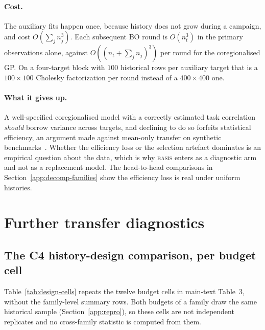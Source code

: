 \documentclass[10pt]{article}
\newcommand{\basis}{\textsc{basis}}
\begin{document}
\paragraph{Cost.}
The auxiliary fits happen once, because history does not grow during a
campaign, and cost $O(\sum_j n_j^3)$. Each subsequent BO round is $O(n_t^3)$
in the primary observations alone, against $O((n_t+\sum_j n_j)^3)$ per round
for the coregionalised GP. On a four-target block with $100$ historical rows
per auxiliary target that is a $100\times100$ Cholesky factorization per round
instead of a $400\times400$ one.

\paragraph{What it gives up.}
A well-specified coregionalised model with a correctly estimated task
correlation \emph{should} borrow variance across targets, and declining to do
so forfeits statistical efficiency, an argument made against mean-only
transfer on synthetic benchmarks~\cite{tighineanu2021transfer}. Whether the
efficiency loss or the selection artefact dominates is an empirical question
about the data, which is why \basis{} enters as a diagnostic arm and not as a
replacement model. The head-to-head comparisons in
Section~\ref{app:decomp-families} show the efficiency loss is real under
uniform histories.

\section{Further transfer diagnostics}
\label{app:transfer-diagnostics}

\subsection{The C4 history-design comparison, per budget cell}
\label{app:design-cells}

Table~\ref{tab:design-cells} repeats the twelve budget cells in main-text
Table~3, without the family-level summary rows. Both budgets of a family draw the same historical
sample (Section~\ref{app:repro}), so these cells are not independent
replicates and no cross-family statistic is computed from them.
\end{document}

